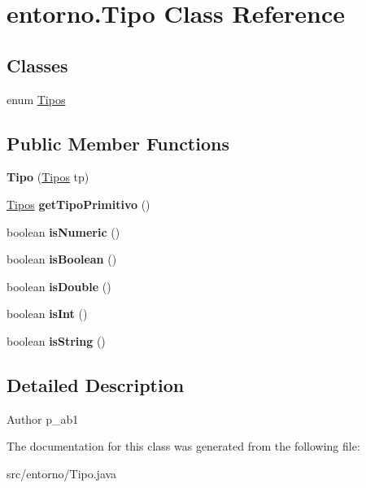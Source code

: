 \hypertarget{classentorno_1_1_tipo}{}\section{entorno.\+Tipo Class Reference}
\label{classentorno_1_1_tipo}
\subsection*{Classes}
\begin{DoxyCompactItemize}
\item 
enum \mbox{\hyperlink{enumentorno_1_1_tipo_1_1_tipos}{Tipos}}
\end{DoxyCompactItemize}
\subsection*{Public Member Functions}
\begin{DoxyCompactItemize}
\item 
\mbox{\label{classentorno_1_1_tipo_a882db5acc300a944b077aee431238539}} 
{\bfseries Tipo} (\mbox{\hyperlink{enumentorno_1_1_tipo_1_1_tipos}{Tipos}} tp)
\item 
\mbox{\label{classentorno_1_1_tipo_a14a0af6d92ec4968334dfda133955fce}} 
\mbox{\hyperlink{enumentorno_1_1_tipo_1_1_tipos}{Tipos}} {\bfseries get\+Tipo\+Primitivo} ()
\item 
\mbox{\label{classentorno_1_1_tipo_a51be477d58b52e4f461683f06c8b90c8}} 
boolean {\bfseries is\+Numeric} ()
\item 
\mbox{\label{classentorno_1_1_tipo_ad874eeb699751c1c9e7c0b4fcfb43fb7}} 
boolean {\bfseries is\+Boolean} ()
\item 
\mbox{\label{classentorno_1_1_tipo_ae75ea520879013495d3ae3770f04f01c}} 
boolean {\bfseries is\+Double} ()
\item 
\mbox{\label{classentorno_1_1_tipo_aa5258513322b2bcb8862d5c4fc760f31}} 
boolean {\bfseries is\+Int} ()
\item 
\mbox{\label{classentorno_1_1_tipo_a1284ae01f6293a1ea856ea5e5c645773}} 
boolean {\bfseries is\+String} ()
\end{DoxyCompactItemize}


\subsection{Detailed Description}
\begin{DoxyAuthor}{Author}
p\+\_\+ab1 
\end{DoxyAuthor}


The documentation for this class was generated from the following file\+:\begin{DoxyCompactItemize}
\item 
src/entorno/Tipo.\+java\end{DoxyCompactItemize}
